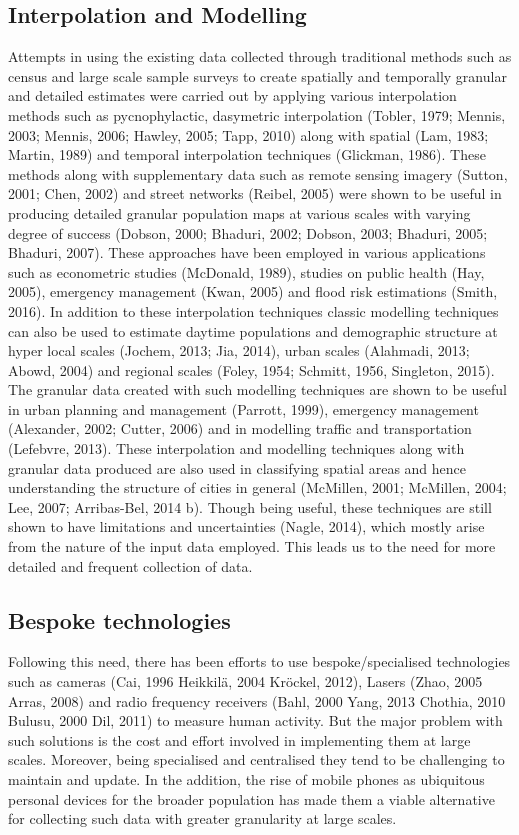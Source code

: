 \subsection{Interpolation and Modelling}
Attempts in using the existing data collected through traditional methods such as census and large scale sample surveys to create spatially and temporally granular and detailed estimates were carried out by applying various interpolation methods such as pycnophylactic, dasymetric interpolation (Tobler, 1979; Mennis, 2003; Mennis, 2006; Hawley, 2005; Tapp, 2010) along with spatial (Lam, 1983; Martin, 1989) and temporal interpolation techniques (Glickman, 1986).
These methods along with supplementary data such as remote sensing imagery (Sutton, 2001; Chen, 2002) and street networks (Reibel, 2005) were shown to be useful in producing detailed granular population maps at various scales with varying degree of success (Dobson, 2000; Bhaduri, 2002; Dobson, 2003; Bhaduri, 2005; Bhaduri, 2007).
These approaches have been employed in various applications such as econometric studies (McDonald, 1989), studies on public health (Hay, 2005), emergency management (Kwan, 2005) and flood risk estimations (Smith, 2016).
In addition to these interpolation techniques classic modelling techniques can also be used to estimate daytime populations and demographic structure at hyper local scales (Jochem, 2013; Jia, 2014), urban scales (Alahmadi, 2013; Abowd, 2004) and regional scales (Foley, 1954; Schmitt, 1956, Singleton, 2015).
The granular data created with such modelling techniques are shown to be useful in urban planning and management (Parrott, 1999), emergency management (Alexander, 2002; Cutter, 2006) and in modelling traffic and transportation (Lefebvre, 2013).
These interpolation and modelling techniques along with granular data produced are also used in classifying spatial areas and hence understanding the structure of cities in general (McMillen, 2001; McMillen, 2004; Lee, 2007; Arribas-Bel, 2014 b).
Though being useful, these techniques are still shown to have limitations and uncertainties (Nagle, 2014), which mostly arise from the nature of the input data employed.
This leads us to the need for more detailed and frequent collection of data.

\subsection{Bespoke technologies}

Following this need, there has been efforts to use bespoke/specialised technologies such as cameras (Cai, 1996 Heikkilä, 2004 Kröckel, 2012), Lasers (Zhao, 2005 Arras, 2008) and radio frequency receivers  (Bahl, 2000 Yang, 2013 Chothia, 2010 Bulusu, 2000 Dil, 2011) to measure human activity.
But the major problem with such solutions is the cost and effort involved in implementing them at large scales.
Moreover, being specialised and centralised they tend to be challenging to maintain and update.
In the addition, the rise of mobile phones as ubiquitous personal devices for the broader population has made them a viable alternative for collecting such data with greater granularity at large scales.

